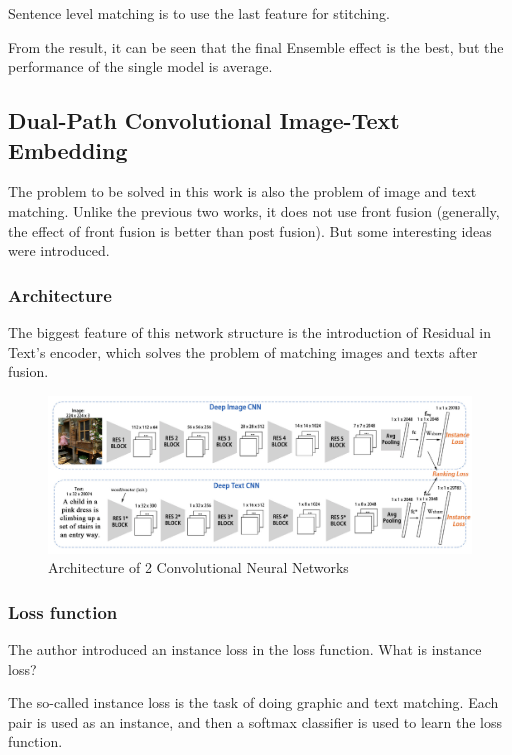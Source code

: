 Sentence level matching is to use the last feature for stitching.

From the result, it can be seen that the final Ensemble effect is the best, but the performance of the single model is average.

\subsection{Dual-Path Convolutional Image-Text Embedding}

The problem to be solved in this work \cite{zheng2017dualpath} is also the problem of image and text matching. Unlike the previous two works, it does not use front fusion (generally, the effect of front fusion is better than post fusion). But some interesting ideas were introduced.

\subsubsection{Architecture}
The biggest feature of this network structure is the introduction of Residual in Text's encoder, which solves the problem of matching images and texts after fusion.

\begin{figure}[h!]
\centering
\includegraphics[width=\textwidth]{dpcit1.pdf}
\caption{Architecture of 2 Convolutional Neural Networks \cite{zheng2017dualpath}}
\label{fig:dpcit1}
\end{figure}

\subsubsection{Loss function}
The author introduced an instance loss in the loss function. What is instance loss?

The so-called instance loss is the task of doing graphic and text matching. Each pair is used as an instance, and then a softmax classifier is used to learn the loss function.


